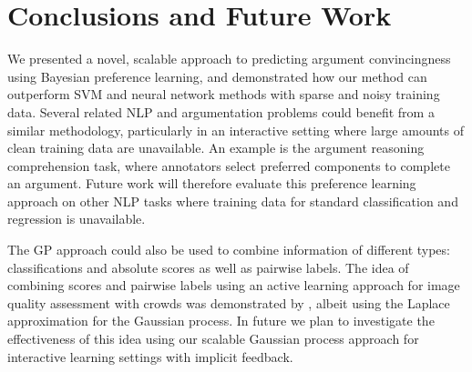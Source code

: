 \section{Conclusions and Future Work}

We presented a novel, scalable approach to predicting argument convincingness using Bayesian preference learning,
and demonstrated how our method can outperform SVM and neural network methods with sparse and noisy 
training data.
Several related NLP and argumentation problems could benefit from a similar methodology, particularly in an 
interactive setting where large amounts of clean training data are unavailable. 
An example is the argument reasoning comprehension task\cite{habernal2017arg}, 
where annotators select preferred components to complete an argument. 
Future work will therefore evaluate this preference learning approach on 
other NLP tasks where training data for standard classification and regression is unavailable.

The GP approach could also be used to combine information of different types: classifications and 
absolute scores as well as pairwise labels. The idea of combining scores and pairwise labels 
using an active learning approach for image quality assessment with crowds was demonstrated by
\cite{ye2013combining}, albeit using the Laplace approximation for the Gaussian process. 
In future we plan to investigate the effectiveness of this idea using our 
scalable Gaussian process approach for interactive learning settings with implicit feedback.
